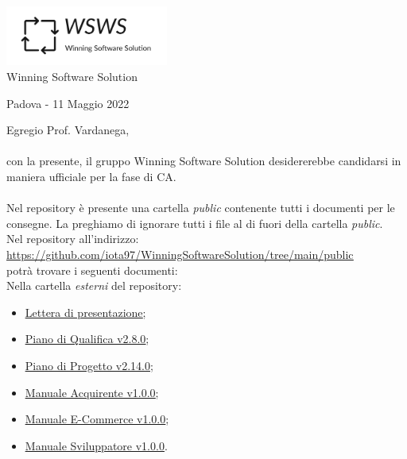 \documentclass[a4paper, 12pt]{letter}
\begin{document}
\begin{center}
\includegraphics[width=0.4\textwidth]{WSWS-logos_transparent_crop}\\
{\Large Winning Software Solution}\\[24pt]
\end{center}
\begin{flushright}
    Padova - 11 Maggio 2022
\end{flushright}
Egregio Prof. Vardanega,\\\\
con la presente, il gruppo Winning Software Solution desidererebbe candidarsi in maniera ufficiale
per la fase di CA.\\\\
Nel repository è presente una cartella \textit{public} contenente tutti i documenti per le consegne. La preghiamo di ignorare tutti i file
al di fuori della cartella \textit{public}.\\
Nel repository all'indirizzo: \\
\href{https://github.com/iota97/WinningSoftwareSolution/tree/main/public}{\underline{https://github.com/iota97/WinningSoftwareSolution/tree/main/public}}\\ 
potrà trovare i seguenti documenti:\\

Nella cartella \textit{esterni} del repository:
\begin{itemize}
\item \href{https://github.com/iota97/WinningSoftwareSolution/tree/main/public/esterni/lettera_di_presentazione.pdf}{\underline{Lettera di presentazione}};
\item \href{https://github.com/iota97/WinningSoftwareSolution/tree/main/public/esterni/piano_di_qualifica_v2.8.0.pdf}{\underline{Piano di Qualifica v2.8.0}};
\item \href{https://github.com/iota97/WinningSoftwareSolution/tree/main/public/esterni/piano_di_progetto_v2.14.0.pdf}{\underline{Piano di Progetto v2.14.0}};
\item \href{https://github.com/iota97/WinningSoftwareSolution/tree/main/public/esterni/manuale_acquirente_v1.0.0.pdf}{\underline{Manuale Acquirente v1.0.0}};
\item \href{https://github.com/iota97/WinningSoftwareSolution/tree/main/public/esterni/manuale_e-commerce_v1.0.0.pdf}{\underline{Manuale E-Commerce v1.0.0}};
\item \href{https://github.com/iota97/WinningSoftwareSolution/tree/main/public/esterni/manuale_sviluppatore_v1.0.0.pdf}{\underline{Manuale Sviluppatore v1.0.0}}.
\end{itemize}
\end{document}
